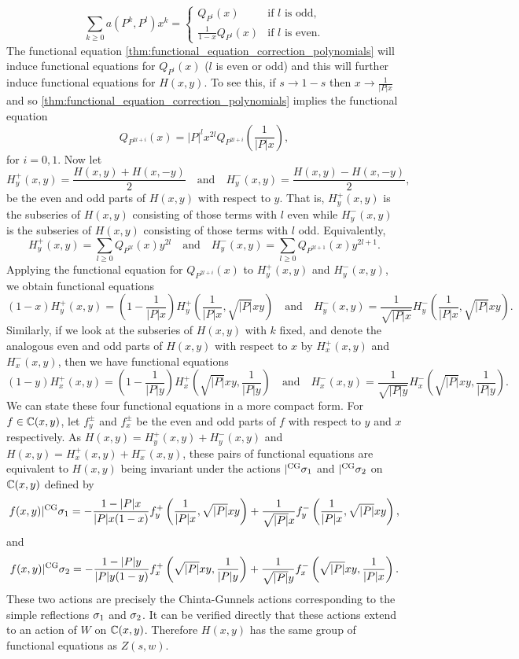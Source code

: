\documentclass[12pt,reqno,oneside]{amsart}
\begin{document}
    \[
        \sum_{k \ge 0}a(P^{k},P^{l})x^{k} = \begin{cases} Q_{P^{l}}(x) & \text{if $l$ is odd}, \\ \frac{1}{1-x}Q_{P^{l}}(x) & \text{if $l$ is even}. \end{cases}
    \]
    The functional equation \cref{thm:functional_equation_correction_polynomials} will induce functional equations for $Q_{P^{l}}(x)$ ($l$ is even or odd) and this will further induce functional equations for $H(x,y)$. To see this, if $s \to 1-s$ then $x \to \frac{1}{|P|x}$ and so \cref{thm:functional_equation_correction_polynomials} implies the functional equation
    \[
        Q_{P^{2l+i}}(x) = |P|^{l}x^{2l}Q_{P^{2l+i}}\left(\frac{1}{|P|x}\right),
    \]
    for $i = 0,1$. Now let
    \[
        H_{y}^{+}(x,y) = \frac{H(x,y)+H(x,-y)}{2} \quad \text{and} \quad H_{y}^{-}(x,y) = \frac{H(x,y)-H(x,-y)}{2},
    \]
    be the even and odd parts of $H(x,y)$ with respect to $y$. That is, $H_{y}^{+}(x,y)$ is the subseries of $H(x,y)$ consisting of those terms with $l$ even while $H_{y}^{-}(x,y)$ is the subseries of $H(x,y)$ consisting of those terms with $l$ odd. Equivalently,
    \[
        H_{y}^{+}(x,y) = \sum_{l \ge 0}Q_{P^{2l}}(x)y^{2l} \quad \text{and} \quad H_{y}^{-}(x,y) = \sum_{l \ge 0}Q_{P^{2l+1}}(x)y^{2l+1}.
    \]
    Applying the functional equation for $Q_{P^{2l+i}}(x)$ to $H_{y}^{+}(x,y)$ and $H_{y}^{-}(x,y)$, we obtain functional equations
    \[
        (1-x)H_{y}^{+}(x,y) = \left(1-\frac{1}{|P|x}\right)H_{y}^{+}\left(\frac{1}{|P|x},\sqrt{|P|}xy\right) \quad \text{and} \quad H_{y}^{-}(x,y) = \frac{1}{\sqrt{|P|x}}H_{y}^{-}\left(\frac{1}{|P|x},\sqrt{|P|}xy\right).
    \]
    Similarly, if we look at the subseries of $H(x,y)$ with $k$ fixed, and denote the analogous even and odd parts of $H(x,y)$ with respect to $x$ by $H_{x}^{+}(x,y)$ and $H_{x}^{-}(x,y)$, then we have functional equations
    \[
        (1-y)H_{x}^{+}(x,y) = \left(1-\frac{1}{|P|y}\right)H_{x}^{+}\left(\sqrt{|P|}xy,\frac{1}{|P|y}\right) \quad \text{and} \quad H_{x}^{-}(x,y) = \frac{1}{\sqrt{|P|y}}H_{x}^{-}\left(\sqrt{|P|}xy,\frac{1}{|P|y}\right).
    \]
    We can state these four functional equations in a more compact form. For $f \in \mathbb{C}(x,y)$, let $f_{y}^{\pm}$ and $f_{x}^{\pm}$ be the even and odd parts of $f$ with respect to $y$ and $x$ respectively. As $H(x,y) = H_{y}^{+}(x,y)+H_{y}^{-}(x,y)$ and $H(x,y) = H_{x}^{+}(x,y)+H_{x}^{-}(x,y)$, these pairs of functional equations are equivalent to $H(x,y)$ being invariant under the actions $|^{\mathrm{CG}}\sigma_{1}$ and $|^{\mathrm{CG}}\sigma_{2}$ on $\mathbb{C}(x,y)$ defined by
    \[
        f(x,y)|^{\mathrm{CG}}\sigma_{1} = -\frac{1-|P|x}{|P|x(1-x)}f_{y}^{+}\left(\frac{1}{|P|x},\sqrt{|P|}xy\right)+\frac{1}{\sqrt{|P|}x}f_{y}^{-}\left(\frac{1}{|P|x},\sqrt{|P|}xy\right),
    \]
    and
    \[
        f(x,y)|^{\mathrm{CG}}\sigma_{2} = -\frac{1-|P|y}{|P|y(1-y)}f_{x}^{+}\left(\sqrt{|P|}xy,\frac{1}{|P|y}\right)+\frac{1}{\sqrt{|P|}y}f_{x}^{-}\left(\sqrt{|P|}xy,\frac{1}{|P|x}\right).
    \]
    These two actions are precisely the Chinta-Gunnels actions corresponding to the simple reflections $\sigma_{1}$ and $\sigma_{2}$. It can be verified directly that these actions extend to an action of $W$ on $\mathbb{C}(x,y)$. Therefore $H(x,y)$ has the same group of functional equations as $Z(s,w)$.

    
    
\end{document}
